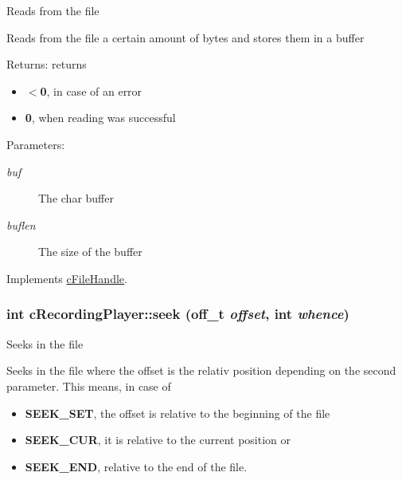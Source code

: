 Reads from the file

Reads from the file a certain amount of bytes and stores them in a buffer

\begin{Desc}
\item[Returns:]returns\begin{itemize}
\item {\bf $<$0}, in case of an error\item {\bf 0}, when reading was successful\end{itemize}
\end{Desc}
\begin{Desc}
\item[Parameters:]
\begin{description}
\item[{\em buf}]The char buffer \item[{\em buflen}]The size of the buffer \end{description}
\end{Desc}


Implements \hyperlink{classcFileHandle_458f25a4c7f62d528cffc84e66d38e7d}{cFileHandle}.\hypertarget{classcRecordingPlayer_43f7ba867374d6be9e78c68c872bf608}{
\subsubsection[{seek}]{\setlength{\rightskip}{0pt plus 5cm}int cRecordingPlayer::seek (off\_\-t {\em offset}, \/  int {\em whence})}}
\label{classcRecordingPlayer_43f7ba867374d6be9e78c68c872bf608}


Seeks in the file

Seeks in the file where the offset is the relativ position depending on the second parameter. This means, in case of

\begin{itemize}
\item {\bf SEEK\_\-SET}, the offset is relative to the beginning of the file\item {\bf SEEK\_\-CUR}, it is relative to the current position or\item {\bf SEEK\_\-END}, relative to the end of the file.\end{itemize}


